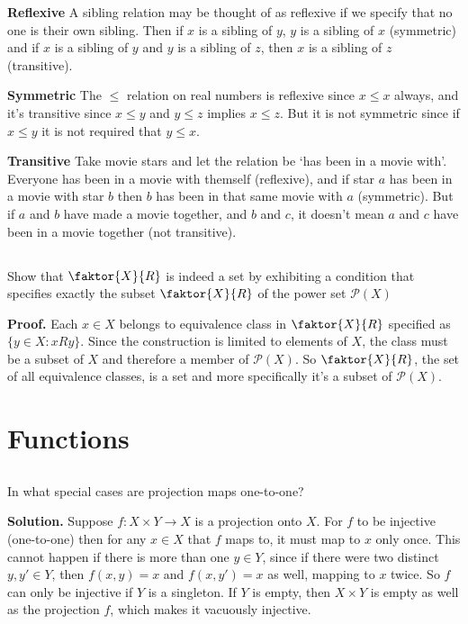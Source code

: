 \documentclass{article}
\begin{document}
\textbf{Reflexive} A sibling relation may be thought of as reflexive if we specify that no one is their own sibling. Then if $x$ is a sibling of $y$, $y$ is a sibling of $x$ (symmetric) and if $x$ is a sibling of $y$ and $y$ is a sibling of $z$, then $x$ is a sibling of $z$ (transitive).

\textbf{Symmetric} The $\leq$ relation on real numbers is reflexive since $x \leq x$ always, and it's transitive since $x \leq y$ and $y \leq z$ implies $x \leq z$. But it is not symmetric since if $x \leq y$ it is not required that $y \leq x$. 

\textbf{Transitive} Take movie stars and let the relation be `has been in a movie with'. Everyone has been in a movie with themself (reflexive), and if star $a$ has been in a movie with star $b$ then $b$ has been in that same movie with $a$ (symmetric). But if $a$ and $b$ have made a movie together, and $b$ and $c$, it doesn't mean $a$ and $c$ have been in a movie together (not transitive).

\subsection{} Show that $\faktor{X}{R}$ is indeed a set by exhibiting a condition that specifies exactly the subset $\faktor{X}{R}$ of the power set $\mathscr{P}(X)$

\textbf{Proof.} Each $x \in X$ belongs to equivalence class in $\faktor{X}{R}$ specified as $\{y \in X: xRy\}$. Since the construction is limited to elements of $X$, the class must be a subset of $X$ and therefore a member of $\mathscr{P}(X)$. So $\faktor{X}{R}$, the set of all equivalence classes, is a set and more specifically it's a subset of $\mathscr{P}(X)$.

\section{Functions}

\subsection{} In what special cases are projection maps one-to-one?

\textbf{Solution.} Suppose $f: X \times Y \longrightarrow X$ is a projection onto $X$. For $f$ to be injective (one-to-one) then for any $x \in X$ that $f$ maps to, it must map to $x$ only once. This cannot happen if there is more than one $y \in Y$, since if there were two distinct $y, y' \in Y$, then $f(x, y) = x$ and $f(x, y') = x$ as well, mapping to $x$ twice. So $f$ can only be injective if $Y$ is a singleton. If $Y$ is empty, then $X \times Y$ is empty as well as the projection $f$, which makes it vacuously injective.
\end{document}
